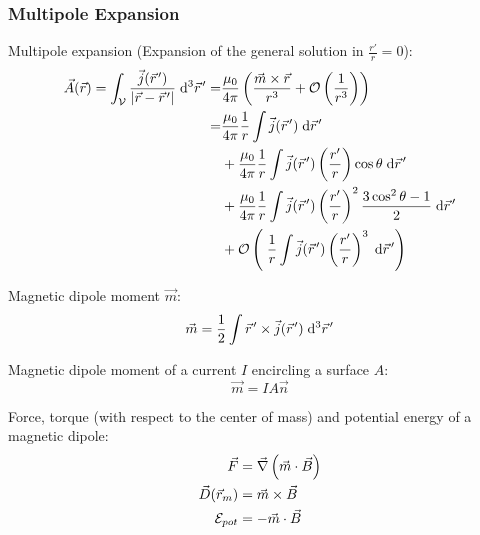 		\subsubsection{Multipole Expansion}
			\noindent
			Multipole expansion (Expansion of the general solution in $\frac{r'}{r}=0$):
			\begin{equation}
				\begin{aligned}
					\vec{A}(\vec{r}) = \int_{\mathcal{V}} \frac{\vec{j}(\pvec{r}')}{\left|\vec{r}-\pvec{r}'\right|} \;\dd^3\pvec{r}'
					=& \frac{\mu_0}{4\pi} \left(\frac{\vec{m}\times\vec{r}}{r^3} + \mathcal{O}\left(\frac{1}{r^3}\right)\right) \\
					=& \frac{\mu_0}{4\pi}\frac{1}{r}\int\vec{j}(\pvec{r}')\;\dd \pvec{r}' \\
					&+ \frac{\mu_0}{4\pi}\frac{1}{r}\int\vec{j}(\pvec{r}')\left(\frac{r'}{r}\right)\cos\theta\;\dd \pvec{r}' \\
					&+ \frac{\mu_0}{4\pi}\frac{1}{r}\int\vec{j}(\pvec{r}')\left(\frac{r'}{r}\right)^2\frac{3\cos^2\theta-1}{2}\;\dd \pvec{r}' \\
					&+ \mathcal{O}\left(\;\frac{1}{r}\int\vec{j}(\pvec{r}')\left(\frac{r'}{r}\right)^3 \;\dd \pvec{r}'\right) \\
				\end{aligned}
			\end{equation}

			\noindent
			Magnetic dipole moment $\vec{m}$:
			\begin{equation}
				\begin{aligned}
					\vec{m} = \frac{1}{2}\int \pvec{r}'\times\vec{j}(\pvec{r}')\;\dd^3\pvec{r}'
				\end{aligned}
			\end{equation}

			\noindent
			Magnetic dipole moment of a current $I$ encircling a surface $A$:
			\begin{equation}
				\vec{m} = IA\vec{n}
			\end{equation}

			\noindent
			Force, torque (with respect to the center of mass) and potential energy of a magnetic dipole:
			\begin{equation}
				\begin{aligned}
					\vec{F} &= \vec{\nabla}\left(\vec{m}\cdot\vec{B}\right) \\
					\vec{D}(\vec{r}_m) &= \vec{m}\times\vec{B} \\
					\mathcal{E}_{pot} &= -\vec{m}\cdot\vec{B} \\
				\end{aligned}
				\label{Eq:MagneticDipoleInteraction}
			\end{equation}

